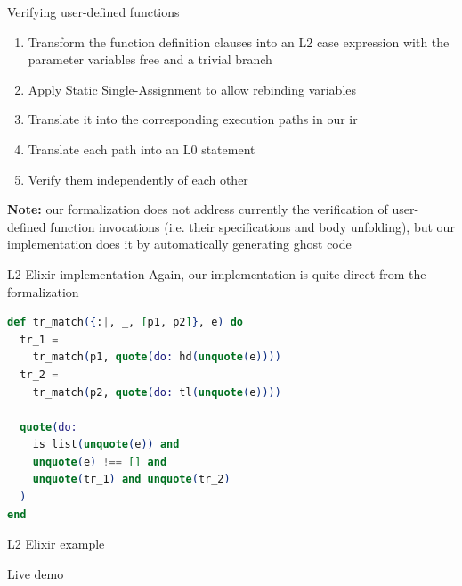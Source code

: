 \documentclass{beamer}
\begin{document}
  \begin{frame}{Verifying user-defined functions}
    \begin{enumerate}
      \item \pause Transform the function definition clauses into an L2 case 
        expression with the parameter variables free and a trivial branch
      \item \pause Apply Static Single-Assignment to allow rebinding variables
      \item \pause Translate it into the corresponding execution paths in our \gls*{ir}
      \item \pause Translate each path into an L0 statement
      \item \pause Verify them independently of each other
    \end{enumerate}

    \pause \textbf{Note:} our formalization does not address currently the verification 
    of user-defined function invocations (i.e. their specifications and body unfolding),
    but our implementation does it by automatically generating ghost code
  \end{frame}
  \begin{frame}[fragile]{L2 Elixir implementation}
    Again, our implementation is quite direct from the formalization

    \pause
    \small
    \begin{lstlisting}[language=elixir,numbers=none,frame=none]
def tr_match({:|, _, [p1, p2]}, e) do
  tr_1 = 
    tr_match(p1, quote(do: hd(unquote(e))))
  tr_2 = 
    tr_match(p2, quote(do: tl(unquote(e))))

  quote(do:
    is_list(unquote(e)) and 
    unquote(e) !== [] and
    unquote(tr_1) and unquote(tr_2)
  )
end
    \end{lstlisting}
  \end{frame}
  \begin{frame}[plain,c]{L2 Elixir example}
    \begin{center}
      \Huge Live demo
    \end{center}
  \end{frame}
\end{document}

